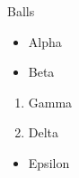 \documentclass[17pt]{beamer}
\begin{document}
\begin{frame}{Balls}
\begin{itemize}
\item Alpha
\item Beta
\end{itemize}
\end{frame}
\begin{frame}
\begin{enumerate}
\item Gamma
\item Delta
\end{enumerate}
\begin{itemize}
\item Epsilon
\end{itemize}
\end{frame}
\end{document}
